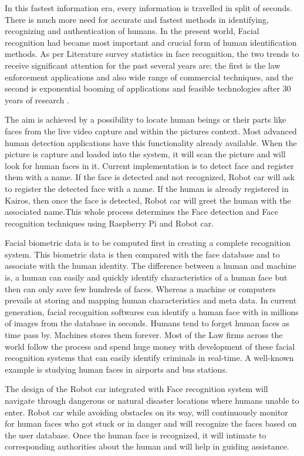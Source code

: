 \documentclass[sigconf]{acmart}
\begin{document}
In this fastest information era, every information is travelled in split of seconds. There is much more need for accurate and fastest methods in identifying, recognizing and authentication of humans. In the present world, Facial recognition had became most important and crucial form of human identification methods. As per Literature survey statistics in face recognition, the two trends to receive significant attention for the past several years are; the first is the law enforcement applications and also wide range of commercial techniques, and the second is exponential booming of applications and feasible technologies after 30 years of research \cite{riddhi2013}.

The aim is achieved by a possibility to locate human beings or their parts like faces from the live video capture and within the pictures context. Most advanced human detection applications have this functionality already available. When the picture is capture and loaded into the system, it will scan the picture and will look for human faces in it. Current implementation is to detect face and register them with a name. If the face is detected and not recognized, Robot car will ask to register the detected face with a name. If the human is already registered in Kairos, then once the face is detected, Robot car will greet the human with the associated name.This whole process determines the Face detection and Face recognition techniques using Raspberry Pi and Robot car.

Facial biometric data is to be computed first in creating a complete recognition system. This biometric data is then compared with the face database and to associate with the human identity. The difference between a human and machine is, a human can easily and quickly identify characteristics of a human face but then can only save few hundreds of faces. Whereas a machine or computers prevails at storing and mapping human characteristics and meta data. In current generation, facial recognition softwares can identify a human face with in millions of images from the database in seconds. Humans tend to forget human faces as time pass by. Machines stores them forever. Most of the Law firms across the world follow the process and spend huge money with development of these facial recognition systems that can easily identify criminals in real-time. A well-known example is studying human faces in airports and bus stations.

The design of the Robot car integrated with Face recognition system will navigate through dangerous or natural disaster locations where humans unable to enter. Robot car while avoiding obstacles on its way, will continuously monitor for human faces who got stuck or in danger and will recognize the faces based on the user database. Once the human face is recognized, it will intimate to corresponding authorities about the human and will help in guiding assistance. 
\end{document}
